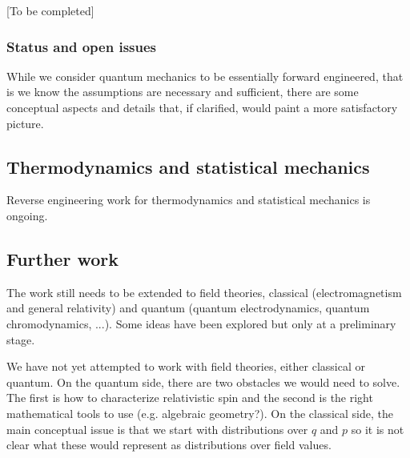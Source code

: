 \documentclass[twocolumn]{article}
\newif\ifextended
\newcommand\fact[2]{\ifextended \emph{#1}. #2 \fi}
\begin{document}
[To be completed]


\subsubsection{Status and open issues}

While we consider quantum mechanics to be essentially forward engineered, that is we know the assumptions are necessary and sufficient, there are some conceptual aspects and details that, if clarified, would paint a more satisfactory picture.

\fact{Link between quantum hydrodynamics, stochastic mechanics, Bohmian mechanics}{We should be able to reconcile the fact that quantum mechanics can be reframed in these different ways. The fact that hydrodynamics-like equations emerge should be linked to the idea that a quantum is a finite size object that can be thought as made of infinitesimal parts, as a fluid. Each part, though, is subjected by the Brownian motion associated with the unknowable internal dynamics. Stochastic mechanics, then, characterizes those fluctuations while Bohmian mechanics characterizes the average paths.}

\fact{Deriving quantum from classical}{If the above characterizations are understood, we should be able, in line of principle, to take a classical system, couple it with a suitable purely stochastic dynamic and recover quantum mechanics.}

\subsection{Thermodynamics and statistical mechanics}

Reverse engineering work for thermodynamics and statistical mechanics is ongoing.

\subsection{Further work}

The work still needs to be extended to field theories, classical (electromagnetism and general relativity) and quantum (quantum electrodynamics, quantum chromodynamics, ...). Some ideas have been explored but only at a preliminary stage.

We have not yet attempted to work with field theories, either classical or quantum. On the quantum side, there are two obstacles we would need to solve. The first is how to characterize relativistic spin and the second is the right mathematical tools to use (e.g. algebraic geometry?). On the classical side, the main conceptual issue is that we start with distributions over $q$ and $p$ so it is not clear what these would represent as distributions over field values.
\end{document}
